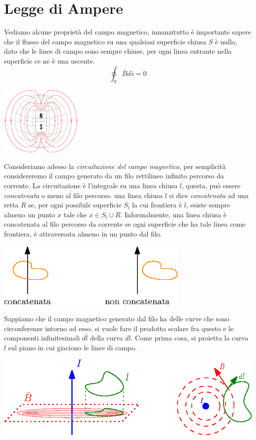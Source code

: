 \documentclass[10pt, letterpaper]{report}
\begin{document}
\section{Legge di Ampere}
Vediamo alcune proprietà del campo magnetico, innanzitutto è importante sapere che il flusso del campo magnetico su una qualsiasi superficie chiusa $S$ è nullo, dato che le linee di campo sono sempre chiuse, per ogni linea entrante nella superficie ce ne è una uscente. 
$$ \oint_S \bar B d\bar s = 0$$\begin{center}
    \includegraphics[width=0.3\textwidth ]{images/flussoMagnetico.png}
\end{center}
Consideriamo adesso la \textit{circuitazione del campo magnetico}, per semplicità considereremo il campo generato da un filo rettilineo infinito percorso da corrente. La circuitazione è l'integrale su una linea chiusa $l$, questa, può essere \textit{concatenata} o meno al filo percorso.\acc 
{} una linea chiusa $l$ si dice \textit{concatenata} ad una retta $R$ se, per ogni possibile superficie $S_l$ la cui frontiera è $l$, esiste sempre almeno un punto $x$ tale che $x\in S_l \cup R$.\acc 
Informalmente, una linea chiusa è concatenata al filo percorso da corrente se ogni superficie che ha tale linea come frontiera, è attraversata almeno in un punto dal filo.\begin{center}
    \includegraphics[width=0.7\textwidth ]{images/concatenata.eps}
\end{center}
Sappiamo che il campo magnetico generato dal filo ha delle curve che sono circonferenze intorno ad esso, si vuole fare il prodotto scalare fra questo e le componenti infinitesimali $d\bar l$ della curva $dl$. Come prima cosa, si proietta la curva $l$ sul piano in cui giaciono le linee di campo.\begin{center}
    \includegraphics[width=\textwidth ]{images/CircuitazioneCampoMagnetico.eps}
\end{center}
\end{document}
